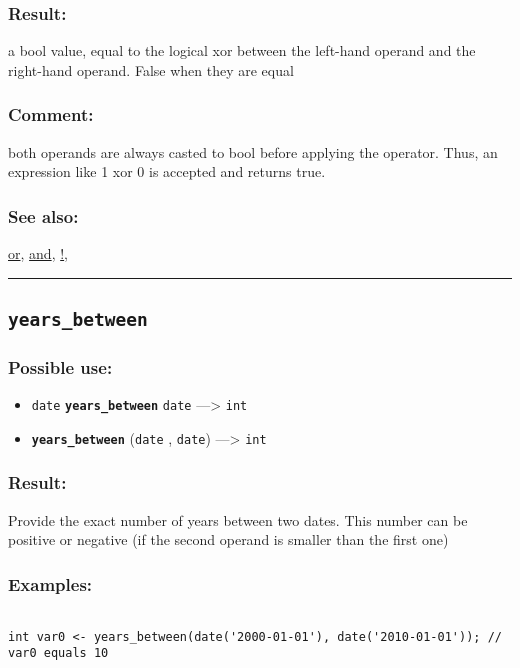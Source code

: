 \documentclass[]{book}
\providecommand{\tightlist}{%
  \setlength{\itemsep}{0pt}\setlength{\parskip}{0pt}}
\theoremstyle{definition}
\theoremstyle{definition}
\theoremstyle{definition}
\theoremstyle{remark}
\begin{document}
\subsubsection{Result:}\label{result-545}

a bool value, equal to the logical xor between the left-hand operand and
the right-hand operand. False when they are equal

\subsubsection{Comment:}\label{comment-114}

both operands are always casted to bool before applying the operator.
Thus, an expression like 1 xor 0 is accepted and returns true.

\subsubsection{See also:}\label{see-also-226}

\href{OperatorsNR\#or}{or}, \href{OperatorsAA\#and}{and},
\href{OperatorsAA\#!}{!},

\begin{center}\rule{0.5\linewidth}{\linethickness}\end{center}

\subsection{\texorpdfstring{\texttt{years\_between}}{years\_between}}\label{years_between}

\subsubsection{Possible use:}\label{possible-use-567}

\begin{itemize}
\tightlist
\item
  \texttt{date} \textbf{\texttt{years\_between}} \texttt{date}
  ---\textgreater{} \texttt{int}
\item
  \textbf{\texttt{years\_between}} (\texttt{date} , \texttt{date})
  ---\textgreater{} \texttt{int}
\end{itemize}

\subsubsection{Result:}\label{result-546}

Provide the exact number of years between two dates. This number can be
positive or negative (if the second operand is smaller than the first
one)

\subsubsection{Examples:}\label{examples-391}

\begin{verbatim}
 
int var0 <- years_between(date('2000-01-01'), date('2010-01-01')); // var0 equals 10
\end{verbatim}

\printindex
\end{document}
